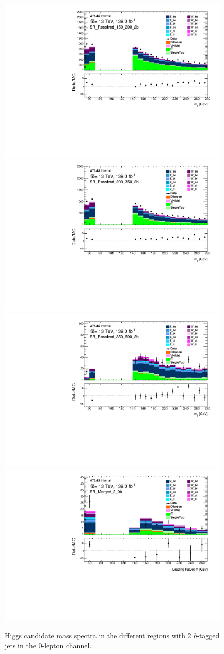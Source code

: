 \begin{figure}[!htb]
    \includegraphics[width=0.46\linewidth]{chapters/c8/figures/0L/DataMC_MonoH_Nominal_SR_Resolved_150_200_2b_m_jj_10GeV.pdf}
    \includegraphics[width=0.46\linewidth]{chapters/c8/figures/0L/DataMC_MonoH_Nominal_SR_Resolved_200_350_2b_m_jj_10GeV.pdf}\\
    \includegraphics[width=0.46\linewidth]{chapters/c8/figures/0L/DataMC_MonoH_Nominal_SR_Resolved_350_500_2b_m_jj_10GeV.pdf}
    \includegraphics[width=0.46\linewidth]{chapters/c8/figures/0L/DataMC_MonoH_Nominal_SR_Merged_2_0b_fatjets_m1_20GeV.pdf}
    \caption{Higgs candidate mass spectra in the different \met regions with 2 $b$-tagged jets in the 0-lepton channel.}
    \label{fig:data-mc-0l-mjj-2b}
\end{figure}

